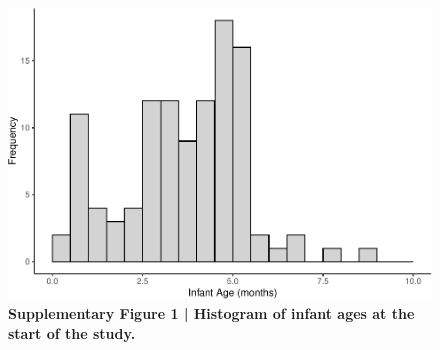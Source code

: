 \documentclass[
]{article}
\begin{document}
\begin{figure}[p]

{\centering \includegraphics[width=1\linewidth,]{MIPH_childdev_files/figure-latex/supp figure 1-1} 

}

\caption{\textbf{Supplementary Figure 1 | Histogram of infant ages at the start of the study.}}\label{fig:supp figure 1}
\end{figure}
\end{document}
